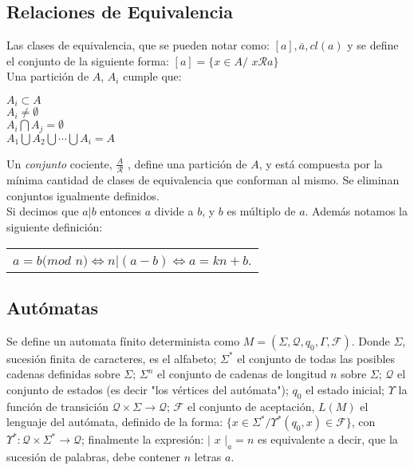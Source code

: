 \documentclass[titlepage,a4paper,12pt,twoside]{article}
\begin{document}
\subsection{Relaciones de Equivalencia}

Las clases de equivalencia, que se pueden notar como: $[a], \overline{a}, cl(a)$ y se define el conjunto de la siguiente forma: $[a] = \{x \in A / $ $x \mathcal{R} a\}$\\

Una partición de $A$, $A_{i}$ cumple que:
\begin{center}
 $A_{i} \subset A$\\
 $A_{i} \neq \emptyset$\\
 $A_{i} \bigcap A_{j} = \emptyset$\\
 $A_{1} \bigcup A_{2} \bigcup \cdots \bigcup A_{i} = A$\\
\end{center}

Un \textit{conjunto} cociente, $\frac{A}{\mathcal{R}}$ , define una partición de $A$, y está compuesta por la mínima cantidad de clases de equivalencia que conforman al mismo. Se eliminan conjuntos igualmente definidos.\\

Si decimos que $a|b$ entonces $a$ divide a $b$, y $b$ es múltiplo de $a$. Además notamos la siguiente definición: 

\begin{table}[htbp]
\centering
\begin{tabular}{l}
 $a = b(mod $ $n) \Leftrightarrow n|(a-b) \Leftrightarrow a = kn + b$.\\
\end{tabular}
\label{tabla}
\end{table}

\subsection{Autómatas}

Se define un automata fínito determinista como $M = (\Sigma,\mathcal{Q},q_{0},\Gamma,\mathcal{F})$. Donde $\Sigma$, sucesión finita de caracteres, es el alfabeto; $\Sigma^{*}$ el conjunto de todas las posibles cadenas definidas sobre $\Sigma$; $\Sigma^{n}$ el conjunto de cadenas de longitud $n$ sobre $\Sigma$; $\mathcal{Q}$ el conjunto de estados (es decir "los vértices del autómata"); $q_{0}$ el estado inicial; $\Upsilon$ la función de transición $\mathcal{Q} \times \Sigma \rightarrow \mathcal{Q}$; $\mathcal{F}$ el conjunto de aceptación, $L(M)$ el lenguaje del autómata, definido de la forma: $\{x \in \Sigma^{*} / \Upsilon^{*}(q_{0},x) \in \mathcal{F}\}$, con $\Upsilon^{*}: \mathcal{Q} \times \Sigma^{*} \rightarrow \mathcal{Q}$; finalmente la expresión: $| $ $ x $ $ |_{a} = n$ es equivalente a decir, que la sucesión de palabras, debe contener $n$ letras $a$.\\
\end{document}
